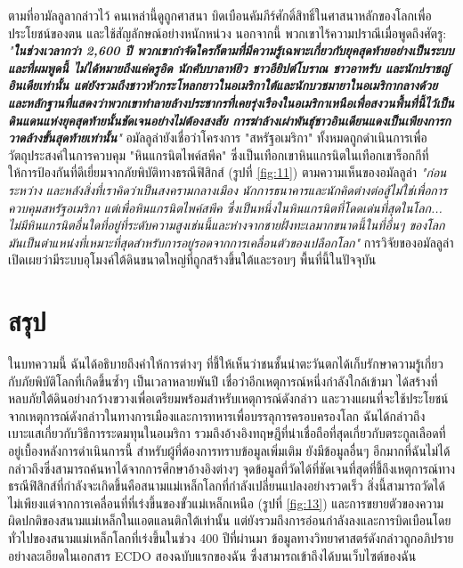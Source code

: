 \documentclass[10pt,twocolumn,letterpaper]{article}
\begin{document}
ตามที่อามัลลูลากล่าวไว้ คนเหล่านี้ดูถูกศาสนา บิดเบือนคัมภีร์ศักดิ์สิทธิ์ในศาสนาหลักของโลกเพื่อประโยชน์ของตน และใช้สัญลักษณ์อย่างหนักหน่วง นอกจากนี้ พวกเขาไร้ความปราณีเมื่อพูดถึงศัตรู: \textit{"\textbf{ในช่วงเวลากว่า 2,600 ปี พวกเขากำจัดใครก็ตามที่มีความรู้เฉพาะเกี่ยวกับยุคสุดท้ายอย่างเป็นระบบ และที่ผมพูดนี้ ไม่ได้หมายถึงแค่ดรูอิด นักคับบาลาห์ยิว ชาวอียิปต์โบราณ ชาวอาหรับ และนักปราชญ์อินเดียเท่านั้น แต่ยังรวมถึงชาวหัวกระโหลกยาวในอเมริกาใต้และนักบวชมายาในอเมริกากลางด้วย และหลักฐานที่แสดงว่าพวกเขาทำลายล้างประชากรที่เคยรุ่งเรืองในอเมริกาเหนือเพื่อสงวนพื้นที่นี้ไว้เป็นดินแดนแห่งยุคสุดท้ายนั้นชัดเจนอย่างไม่ต้องสงสัย การฆ่าล้างเผ่าพันธุ์ชาวอินเดียนแดงเป็นเพียงการกวาดล้างขั้นสุดท้ายเท่านั้น}"} \cite{33,34}
อมัลลูล่ายังเชื่อว่าโครงการ "สหรัฐอเมริกา" ทั้งหมดถูกดำเนินการเพื่อวัตถุประสงค์ในการควบคุม "หินแกรนิตไพค์สพีค" ซึ่งเป็นเทือกเขาหินแกรนิตในเทือกเขาร็อกกีที่ให้การป้องกันที่ดีเยี่ยมจากภัยพิบัติทางธรณีฟิสิกส์ (รูปที่ \ref{fig:11}) ตามความเห็นของอมัลลูล่า \textit{"ก่อน ระหว่าง และหลังสิ่งที่เราคิดว่าเป็นสงครามกลางเมือง นักการธนาคารและนักคิดต่างต่อสู้ไม่ใช่เพื่อการควบคุมสหรัฐอเมริกา แต่เพื่อหินแกรนิตไพค์สพีค ซึ่งเป็นหนึ่งในหินแกรนิตที่โดดเด่นที่สุดในโลก... ไม่มีหินแกรนิตอื่นใดที่อยู่ที่ระดับความสูงเช่นนี้และห่างจากชายฝั่งทะเลมากขนาดนี้ในที่อื่นๆ ของโลก มันเป็นตำแหน่งที่เหมาะที่สุดสำหรับการอยู่รอดจากการเคลื่อนตัวของเปลือกโลก"} \cite{33,34} การวิจัยของอมัลลูล่าเปิดเผยว่ามีระบบอุโมงค์ใต้ดินขนาดใหญ่ที่ถูกสร้างขึ้นใต้และรอบๆ พื้นที่นี้ในปัจจุบัน \cite{36}

\section{สรุป}

ในบทความนี้ ฉันได้อธิบายถึงคำให้การต่างๆ ที่ชี้ให้เห็นว่าชนชั้นนำตะวันตกได้เก็บรักษาความรู้เกี่ยวกับภัยพิบัติโลกที่เกิดขึ้นซ้ำๆ เป็นเวลาหลายพันปี เชื่อว่าอีกเหตุการณ์หนึ่งกำลังใกล้เข้ามา ได้สร้างที่หลบภัยใต้ดินอย่างกว้างขวางเพื่อเตรียมพร้อมสำหรับเหตุการณ์ดังกล่าว และวางแผนที่จะใช้ประโยชน์จากเหตุการณ์ดังกล่าวในทางการเมืองและการทหารเพื่อบรรลุการครอบครองโลก ฉันได้กล่าวถึงเบาะแสเกี่ยวกับวิธีการระดมทุนในอเมริกา รวมถึงอ้างอิงทฤษฎีที่น่าเชื่อถือที่สุดเกี่ยวกับตระกูลเลือดที่อยู่เบื้องหลังการดำเนินการนี้ สำหรับผู้ที่ต้องการทราบข้อมูลเพิ่มเติม ยังมีข้อมูลอื่นๆ อีกมากที่ฉันไม่ได้กล่าวถึงซึ่งสามารถค้นหาได้จากการศึกษาอ้างอิงต่างๆ
จุดข้อมูลที่วัดได้ที่ชัดเจนที่สุดที่ชี้ถึงเหตุการณ์ทางธรณีฟิสิกส์ที่กำลังจะเกิดขึ้นคือสนามแม่เหล็กโลกที่กำลังเปลี่ยนแปลงอย่างรวดเร็ว สิ่งนี้สามารถวัดได้ไม่เพียงแต่จากการเคลื่อนที่ที่เร่งขึ้นของขั้วแม่เหล็กเหนือ (รูปที่ \ref{fig:13}) และการขยายตัวของความผิดปกติของสนามแม่เหล็กในแอตแลนติกใต้เท่านั้น แต่ยังรวมถึงการอ่อนกำลังลงและการบิดเบือนโดยทั่วไปของสนามแม่เหล็กโลกที่เร่งขึ้นในช่วง 400 ปีที่ผ่านมา \cite{3} ข้อมูลทางวิทยาศาสตร์ดังกล่าวถูกอภิปรายอย่างละเอียดในเอกสาร ECDO สองฉบับแรกของฉัน ซึ่งสามารถเข้าถึงได้บนเว็บไซต์ของฉัน \cite{3}
\end{document}
